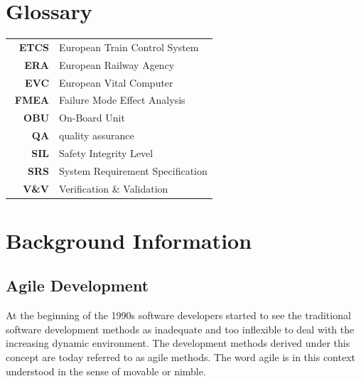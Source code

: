 
\section{Glossary}
\label{sec:glossary}



\begin{tabular}{rl}
\ %
\textbf{ETCS} & European Train Control System \\ 
\textbf{ERA} & European Railway Agency \\ 
\textbf{EVC} & European Vital Computer \\
\textbf{FMEA} & Failure Mode Effect Analysis \\ 
\textbf{OBU} & On-Board Unit \\ 
\textbf{QA} & quality assurance \\
\textbf{SIL} & Safety Integrity Level \\ 
\textbf{SRS} & System Requirement Specification \\ 
\textbf{V\&V} & Verification \& Validation \\ 
\end{tabular} 




\section{Background Information}
\label{sec:Background}


\subsection{Agile Development}

At the beginning of the 1990s software developers started to see the traditional software development methods as inadequate and too inflexible to deal with the increasing dynamic environment. The development methods derived under this concept are today referred to as agile methods. The word agile is in this context understood in the sense of movable or nimble. 

